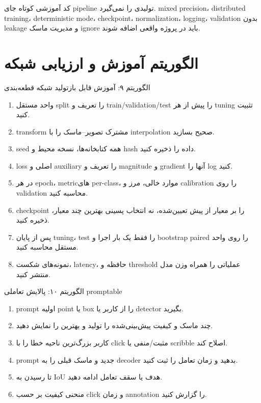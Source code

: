 \documentclass[12pt,openany,oneside]{book}
\begin{document}
\begin{warningbox}
کد آموزشی کوتاه جای pipeline تولیدی را نمی‌گیرد. mixed precision، distributed training، deterministic mode، checkpoint،
normalization، logging، validation بدون leakage و مدیریت ماسک ignore باید در پروژه واقعی اضافه شوند.
\end{warningbox}

\section{الگوریتم آموزش و ارزیابی شبکه}
\begin{algorithmbox}{الگوریتم ۹: آموزش قابل بازتولید شبکه قطعه‌بندی}
\begin{enumerate}
\item واحد مستقل split را تعریف و train/validation/test را پیش از هر tuning تثبیت کنید.
\item transform مشترک تصویر--ماسک را با interpolation صحیح بسازید.
\item seed همه کتابخانه‌ها، نسخه محیط و hash داده را ذخیره کنید.
\item loss اصلی و auxiliary را تعریف و magnitude و gradient آنها را log کنید.
\item در هر epoch، metricهای per-class، موارد خالی، مرز و calibration را روی validation محاسبه کنید.
\item checkpoint را بر معیار از پیش تعیین‌شده، نه انتخاب پسینی بهترین چند معیار، ذخیره کنید.
\item پس از پایان tuning، test را فقط یک بار اجرا و bootstrap paired را روی واحد مستقل محاسبه کنید.
\item نمونه‌های شکست، latency، حافظه و threshold عملیاتی را همراه وزن مدل منتشر کنید.
\end{enumerate}
\end{algorithmbox}

\begin{algorithmbox}{الگوریتم ۱۰: پالایش تعاملی promptable}
\begin{enumerate}
\item prompt اولیه point یا box را از کاربر یا detector بگیرید.
\item چند ماسک و کیفیت پیش‌بینی‌شده را تولید و بهترین را نمایش دهید.
\item کاربر بزرگ‌ترین ناحیه خطا را با click مثبت/منفی یا scribble اصلاح کند.
\item prompt جدید و ماسک قبلی را به decoder بدهید و زمان تعامل را ثبت کنید.
\item تا رسیدن به IoU هدف یا سقف تعامل ادامه دهید.
\item منحنی کیفیت بر حسب click و زمان annotation را گزارش کنید.
\end{enumerate}
\end{algorithmbox}
\end{document}
